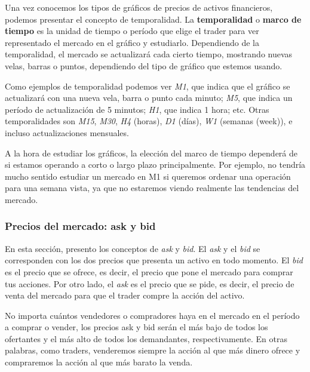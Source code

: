 Una vez conocemos los tipos de gráficos de precios de activos financieros, podemos presentar el concepto de temporalidad. La \textbf{temporalidad} o \textbf{marco de tiempo} es la unidad de tiempo o período que elige el trader para ver representado el mercado en el gráfico y estudiarlo. Dependiendo de la temporalidad, el mercado se actualizará cada cierto tiempo, mostrando nuevas velas, barras o puntos, dependiendo del tipo de gráfico que estemos usando. \newline

Como ejemplos de temporalidad podemos ver \textit{M1}, que indica que el gráfico se actualizará con una nueva vela, barra o punto cada minuto; \textit{M5}, que indica un período de actualización de 5 minutos; \textit{H1}, que indica 1 hora; etc. Otras temporalidades son \textit{M15}, \textit{M30}, \textit{H4} (horas), \textit{D1} (días), \textit{W1} (semanas (week)), e incluso actualizaciones mensuales. \newline

A la hora de estudiar los gráficos, la elección del marco de tiempo dependerá de si estamos operando a corto o largo plazo principalmente. Por ejemplo, no tendría mucho sentido estudiar un mercado en M1 si queremos ordenar una operación para una semana vista, ya que no estaremos viendo realmente las tendencias del mercado. \newline



\subsubsection{Precios del mercado: ask y bid}

En esta sección, presento los conceptos de \textit{ask} y \textit{bid}. El \textit{ask} y el \textit{bid} se corresponden con los dos precios que presenta un activo en todo momento. El \textit{bid} es el precio que se ofrece, es decir, el precio que pone el mercado para comprar tus acciones. Por otro lado, el \textit{ask} es el precio que se pide, es decir, el precio de venta del mercado para que el trader compre la acción del activo.  \newline

No importa cuántos vendedores o compradores haya en el mercado en el período a comprar o vender, los precios ask y bid serán el más bajo de todos los ofertantes y el más alto de todos los demandantes, respectivamente. En otras palabras, como traders, venderemos siempre la acción al que más dinero ofrece y compraremos la acción al que más barato la venda. \newline

